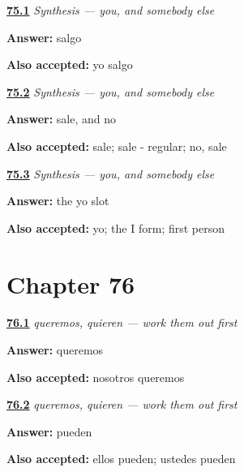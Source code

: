 \noindent\begin{minipage}[t]{\linewidth}
\raggedright
\hyperlink{review-ES-C13-sintesis-yo-go-me}{\textbf{75.1}} \emph{Synthesis — you, and somebody else}\par
\small \textbf{Answer:} salgo\par
\footnotesize \textbf{Also accepted:} yo salgo
\end{minipage}\par\medskip

\noindent\begin{minipage}[t]{\linewidth}
\raggedright
\hyperlink{review-ES-C13-sintesis-yo-go-them}{\textbf{75.2}} \emph{Synthesis — you, and somebody else}\par
\small \textbf{Answer:} sale, and no\par
\footnotesize \textbf{Also accepted:} sale; sale - regular; no, sale
\end{minipage}\par\medskip

\noindent\begin{minipage}[t]{\linewidth}
\raggedright
\hyperlink{review-ES-C13-sintesis-yo-go-which}{\textbf{75.3}} \emph{Synthesis — you, and somebody else}\par
\small \textbf{Answer:} the yo slot\par
\footnotesize \textbf{Also accepted:} yo; the I form; first person
\end{minipage}\par\medskip

\section*{Chapter 76}

\noindent\begin{minipage}[t]{\linewidth}
\raggedright
\hyperlink{review-ES-C13-plurales-cambio-want}{\textbf{76.1}} \emph{queremos, quieren — work them out first}\par
\small \textbf{Answer:} queremos\par
\footnotesize \textbf{Also accepted:} nosotros queremos
\end{minipage}\par\medskip

\noindent\begin{minipage}[t]{\linewidth}
\raggedright
\hyperlink{review-ES-C13-plurales-cambio-can}{\textbf{76.2}} \emph{queremos, quieren — work them out first}\par
\small \textbf{Answer:} pueden\par
\footnotesize \textbf{Also accepted:} ellos pueden; ustedes pueden
\end{minipage}\par\medskip


